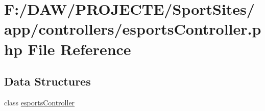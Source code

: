\hypertarget{esports_controller_8php}{}\section{F\+:/\+D\+A\+W/\+P\+R\+O\+J\+E\+C\+T\+E/\+Sport\+Sites/app/controllers/esports\+Controller.php File Reference}
\label{esports_controller_8php}
\subsection*{Data Structures}
\begin{DoxyCompactItemize}
\item 
class \hyperlink{classesports_controller}{esports\+Controller}
\end{DoxyCompactItemize}
